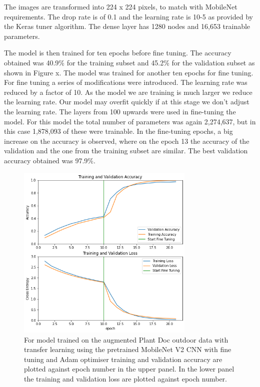 \documentclass[conference]{IEEEtran}
\begin{document}
The images are transformed into 224 x 224 pixels, to match with MobileNet requirements. The drop rate is of 0.1 and the learning rate is 10-5 as provided by the Keras tuner algorithm. The dense layer has 1280 nodes and 16,653 trainable parameters. 

The model is then trained for ten epochs before fine tuning. The accuracy obtained was 40.9\% for the training subset and 45.2\% for the validation subset as shown in Figure x. The model was trained for another ten epochs for fine tuning. For fine tuning a series of modifications were introduced. The learning rate was reduced by a factor of 10. As the model we are training is much larger we reduce the learning rate. Our model may overfit quickly if at this stage we don’t adjust the learning rate. The layers from 100 upwards were used in fine-tuning the model. For this model the total number of parameters was again 2,274,637, but in this case 1,878,093 of these were trainable. In the fine-tuning epochs, a big increase on the accuracy is observed, where on the epoch 13 the accuracy of the validation and the one from the training subset are similar. The best validation accuracy obtained was 97.9\%.
\begin{figure}[htbp]
\centerline{\includegraphics[width=8.5cm]{ModelOutdoorsMobileNetEpochsAccuracychart_new.png}}
\caption{For model trained on the augmented Plant Doc outdoor data with transfer learning using the pretrained MobileNet V2 CNN with fine tuning and Adam optimiser training and validation accuracy are plotted against epoch number in the upper panel. In the lower panel the training and validation loss are plotted against epoch number.}
\label{fig}
\end{figure}

\end{document}
